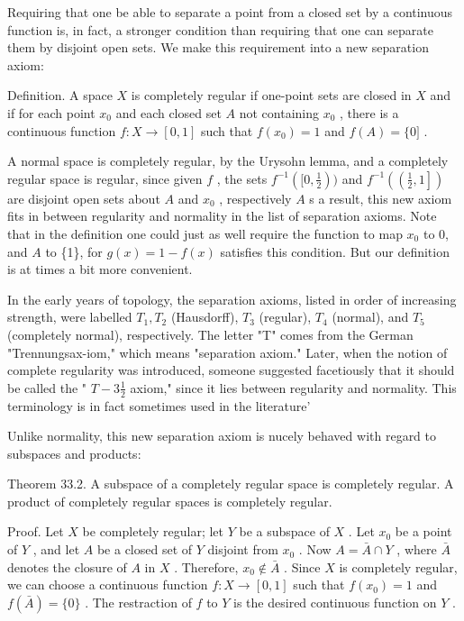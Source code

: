 \documentclass[10pt]{article}
\begin{document}
Requiring that one be able to separate a point from a closed set by a continuous function is, in fact, a stronger condition than requiring that one can separate them by disjoint open sets. We make this requirement into a new separation axiom:

Definition. A space \(X\) is completely regular if one-point sets are closed in \(X\) and if for each point \({x}_{0}\) and each closed set \(A\) not containing \({x}_{0}\) , there is a continuous function \(f : X \rightarrow  \left\lbrack  {0,1}\right\rbrack\) such that \(f\left( {x}_{0}\right)  = 1\) and \(f\left( A\right)  = \{ 0\rbrack\) .

A normal space is completely regular, by the Urysohn lemma, and a completely regular space is regular, since given \(f\) , the sets \({f}^{-1}\left( {\lbrack 0,\frac{1}{2}}\right) )\) and \({f}^{-1}\left( \left( {\frac{1}{2},1}\right\rbrack  \right)\) are disjoint open sets about \(A\) and \({x}_{0}\) , respectively \(A\) s a result, this new axiom fits in between regularity and normality in the list of separation axioms. Note that in the definition one could just as well require the function to map \({x}_{0}\) to 0, and \(A\) to \{1\}, for \(g\left( x\right)  = 1 - f\left( x\right)\) satisfies this condition. But our definition is at times a bit more convenient.

In the early years of topology, the separation axioms, listed in order of increasing strength, were labelled \({T}_{1},{T}_{2}\) (Hausdorff), \({T}_{3}\) (regular), \({T}_{4}\) (normal), and \({T}_{5}\) (completely normal), respectively. The letter "T" comes from the German "Trennungsax-iom," which means "separation axiom." Later, when the notion of complete regularity was introduced, someone suggested facetiously that it should be called the " \(T - 3\frac{1}{2}\) axiom," since it lies between regularity and normality. This terminology is in fact sometimes used in the literature'

Unlike normality, this new separation axiom is nucely behaved with regard to subspaces and products:

Theorem 33.2. A subspace of a completely regular space is completely regular. A product of completely regular spaces is completely regular.

Proof. Let \(X\) be completely regular; let \(Y\) be a subspace of \(X\) . Let \({x}_{0}\) be a point of \(Y\) , and let \(A\) be a closed set of \(Y\) disjoint from \({x}_{0}\) . Now \(A = \bar{A} \cap  Y\) , where \(\bar{A}\) denotes the closure of \(A\) in \(X\) . Therefore, \({x}_{0} \notin  \bar{A}\) . Since \(X\) is completely regular, we can choose a continuous function \(f : X \rightarrow  \left\lbrack  {0,1}\right\rbrack\) such that \(f\left( {x}_{0}\right)  = 1\) and \(f\left( \bar{A}\right)  = \{ 0\}\) . The restraction of \(f\) to \(Y\) is the desired continuous function on \(Y\) .
\end{document}
